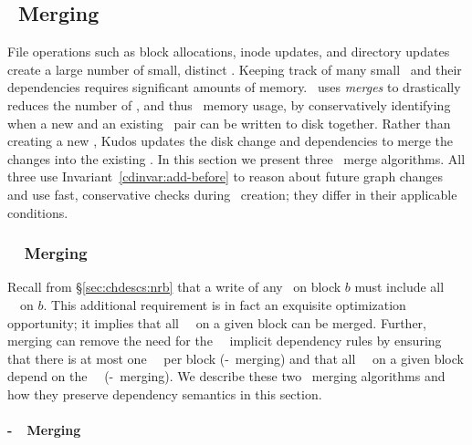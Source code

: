 \subsection{\ChDesc\ Merging}
\label{sec:patch:merge}

File operations such as block allocations, inode updates, and directory updates
create a large number of small, distinct \chdescs. Keeping track of many small
\chdescs\ and their dependencies requires significant amounts of memory.
%
\Kudos\ uses \emph{merges} to drastically reduces the number of \chdescs, and
thus \chdesc\ memory usage, by conservatively identifying when a new and an
existing \chdesc\ pair can be written to disk together. Rather than creating
a new \chdesc, Kudos updates the disk change and dependencies to merge the
changes into the existing \chdesc.
%
In this section we present three \chdesc\ merge algorithms. All three
use Invariant~\ref{cdinvar:add-before} to reason about future graph
changes and use fast, conservative checks during \chdesc\ creation; they
differ in their applicable conditions.

\subsubsection{\Nrb\ \ChDesc\ Merging}
\label{sec:chdescs:merge:nrb}

Recall from \S\ref{sec:chdescs:nrb} that a write of any \chdescs\ on block
$b$ must include all \nrb\ \chdescs\ on $b$.
%
This additional requirement is in fact an exquisite optimization
opportunity; it implies that all \nrb\ \chdescs\ on a given block can
be merged.
%
Further, merging can remove the need for the \nrb\ \chdesc\ implicit
dependency rules by ensuring that
%
there is at most one \nrb\ \chdesc\ per block (\nrb-\nrb\ merging)
%
and that all \rb\ \chdescs\ on a given block depend on the \nrb\ \chdesc\
(\nrb-\rb\ merging).
%
We describe these two \chdesc\ merging algorithms and how they
preserve dependency semantics in this section.

\paragraph{\Nrb-\Nrb\ \ChDesc\ Merging}
\label{sec:chdescs:merge:nrb:hard-hard}

